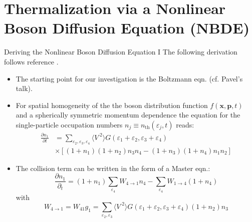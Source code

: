 \section{Thermalization via a Nonlinear Boson Diffusion Equation (NBDE)}

\begin{frame}{Deriving the Nonlinear Boson Diffusion Equation I}
\vspace{0.5em}
The following derivation follows reference \cite{Wolschin2018}. \\[0.5em]
\begin{itemize}
\item The starting point for our investigation is the \alert{Boltzmann eqn.} (cf. Pavel's talk). %
\item For \alert{spatial homogeneity} of the the boson distribution function $f(\mathbf{x}, \mathbf{p}, t)$ and a \alert{spherically symmetric momentum dependence} the equation for the single-particle occupation numbers  $n_j \equiv n_{\mathrm{th}}(\varepsilon_j,t)$ reads:
\begin{align}
\frac{\partial n_1}{\partial t} &= \sum_{\varepsilon_2,\varepsilon_3,\varepsilon_4}\langle V^{\phantom{.}2}\rangle G(\varepsilon_1+\varepsilon_2,\varepsilon_3+\varepsilon_4)\\
&\times \left[(1+n_1)(1+n_2)n_3n_4 - (1+n_3)(1+n_4)n_1n_2\right]
\end{align}

\item The \alert{collision term} can be written in the form of a \alert{Master eqn.}:
\begin{equation}
\frac{\partial n_1}{\partial_t} = (1+n_1)\sum_{\varepsilon_4}W_{4\rightarrow 1}n_4	- \sum_{\varepsilon_4}W_{1\rightarrow 4}(1+n_4)	
\end{equation}
with
\begin{equation}
W_{4\rightarrow 1}=  W_{41}g_1 = \sum_{\varepsilon_2, \varepsilon_3} \langle V^{\phantom{.}2}\rangle G(\varepsilon_1+\varepsilon_2,\varepsilon_3+\varepsilon_4)(1+n_2)n_3
\end{equation}
\end{itemize} 
\end{frame}

